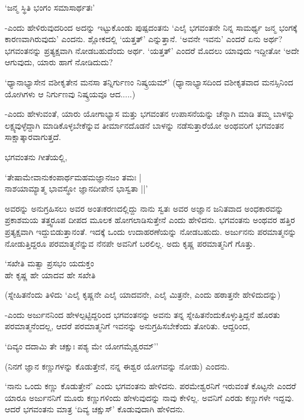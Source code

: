 \begin{shloka}
`ಜನ್ಮ ಸ್ಥಿತಿ ಭಂಗಂ ಸಮಾಸಾರ್ಥತಃ'
\end{shloka}

-ಎಂದು ಹೇಳಿರುವುದರಿಂದ ಅದನ್ನು ಇಟ್ಟುಕೊಂಡು ಪುಷ್ಪದಂತನು `ಎಲೈ ಭಗವಂತನೇ ನಿನ್ನ ಸಾಮರ್ಥ್ಯ ಜನ್ಮ ಭಂಗಕ್ಕೆ ಕಾರಣವಾಗಿರುವುದು' ಎಂದನು. ಶ್ಲೋಕದಲ್ಲಿ `ಯತ್ತತ್' ಎನ್ನುತ್ತಾನೆ. `ಅವನೇ ಇವನು' ಎಂದರೆ ಏನು ಅರ್ಥ? ಭಗವಂತನನ್ನು ಪ್ರತ್ಯಕ್ಷವಾಗಿ ನೋಡಬಹುದೆಂದು ಅರ್ಥ. `ಯತ್ತತ್' ಎಂದರೆ ಮೊದಲು ಯಾವುದು ಇದ್ದೀತೋ `ಅದೇ ಆಗುವುದು, ಯಾರು ಹಾಗೆ ನೋಡಿದುದು?

`ಧ್ಯಾನಾಭ್ಯಾಸೇನ ವಶೀಕೃತೇನ ಮನಸಾ ತನ್ನಿರ್ಗುಣಂ ನಿಷ್ಕ್ರಯಮ್' (ಧ್ಯಾನಾಭ್ಯಾಸದಿಂದ ವಶೀಕೃತವಾದ ಮನಸ್ಸಿನಿಂದ ಯೋಗಿಗಳು ಆ ನಿರ್ಗುಣವು ನಿಷ್ಕ್ರಯವೂ ಆದ.....)

-ಎಂದು ಹೇಳುವಂತೆ, ಯಾರು ಯೋಗಾಭ್ಯಾಸ ಮತ್ತು ಭಗವಂತನ ಉಪಾಸನೆಯನ್ನು ಚೆನ್ನಾಗಿ ಮಾಡಿ ತಮ್ಮ ಬಾಳನ್ನು ಲಕ್ಷ್ಯವುಳ್ಳೆದ್ದಾಗಿ ಮಾಡಿಕೊಳ್ಳಬೇಕೆನ್ನುವ ತೀರ್ಮಾನದೊಡನೆ ಬಾಳನ್ನು ನಡೆಸುತ್ತಾರೆಯೋ ಅಂಥವರಿಗೆ ಭಗವಂತನ ಸಾಕ್ಷಾತ್ಕಾರವಾಗುತ್ತದೆ.

ಭಗವಂತನು ಗೀತೆಯಲ್ಲಿ,

\begin{shloka}
`ತೇಷಾಮೇವಾನುಕಂಪಾರ್ಥಮಹಮಜ್ಞಾನಜಂ ತಮಃ |\\
ನಾಶಯಾಮ್ಯಾತ್ಮ ಭಾವಸ್ಥೋ ಜ್ಞಾನದೀಪೇನ ಭಾಸ್ವತಾ ||'
\end{shloka}

ಅವರನ್ನು ಅನುಗ್ರಹಿಸಲು ಅವರ ಅಂತಃಕರಣದಲ್ಲಿದ್ದು ನಾನು ಸ್ವತಃ ಅವರ ಅಜ್ಞಾನ ಜನಿತವಾದ ಅಂಧಕಾರವನ್ನು ಪ್ರಕಾಶಮಯ ತತ್ತ್ವರೂಪ ದೀಪದ ಮೂಲಕ ಹೋಗಲಾಡಿಸುತ್ತೇನೆ ಎಂದು ಹೇಳಿದನು. ಭಗವಂತನು ಅಂಥವರ ಹತ್ತಿರ ಪ್ರತ್ಯಕ್ಷವಾಗಿ ಇದ್ದುಬಿಡುತ್ತಾನಂತೆ. ಇದಕ್ಕೆ ಒಂದು ಉದಾಹರಣೆಯನ್ನು ನೋಡಬಹುದು. ಅರ್ಜುನನು ಪರಮಾತ್ಮನನ್ನು ನೋಡುತ್ತಿದ್ದರೂ ಪರಮಾತ್ಮನೆನ್ನುವ ನೆನಪೇ ಅವನಿಗೆ ಬರಲಿಲ್ಲ. ಅದು ಕೃಷ್ಣ ಪರಮಾತ್ಮನಿಗೆ ಗೊತ್ತು.

\begin{shloka}
`ಸಖೇತಿ ಮತ್ವಾ ಪ್ರಸಭಂ ಯದುಕ್ತಂ\\
ಹೇ ಕೃಷ್ಣ ಹೇ ಯಾದವ ಹೇ ಸಖೇತಿ
\end{shloka}

(ಸ್ನೇಹಿತನೆಂದು ತಿಳಿದು `ಎಲೈ ಕೃಷ್ಣನೇ ಎಲೈ ಯಾದವನೇ, ಎಲೈ ಮಿತ್ರನೇ, ಎಂದು ಹಠಾತ್ತನೇ ಹೇಳಿದುದನ್ನು)

-ಎಂದು ಅರ್ಜುನನಿಂದ ಹೇಳಲ್ಪಟ್ಟಿದ್ದರಿಂದ ಭಗವಂತನನ್ನು ಅವನು ತನ್ನ ಸ್ನೇಹಿತನೆಂದುಕೊಳ್ಳುತ್ತಿದ್ದನೆ ಹೊರತು ಪರಮಾತ್ಮನೆಂದಲ್ಲ, ಆದರೆ ಪರಮಾತ್ಮನಿಗೆ ಇವನನ್ನು ಅನುಗ್ರಹಿಸಬೇಕೆಂದು ತೋರಿತು. ಆದ್ದರಿಂದ,

\begin{shloka}
`ದಿವ್ಯಂ ದದಾಮಿ ತೇ ಚಕ್ಷುಃ ಪಶ್ಯ ಮೇ ಯೋಗಮೈಶ್ವರಮ್''
\end{shloka}

(ನಿನಗೆ ಜ್ಞಾನ ಕಣ್ಣುಗಳನ್ನು ಕೊಡುತ್ತೇನೆ, ನನ್ನ ಈಶ್ವರ ಯೋಗವನ್ನು ನೋಡು) ಎಂದನು.

`ನಾನು ಒಂದು ಕಣ್ಣು ಕೊಡುತ್ತೇನೆ' ಎಂದು ಭಗವಂತನು ಹೇಳಿದನು. ಪರಮೇಶ್ವರನಿಗೆ ಇರುವಂತೆ ಕೊಟ್ಟನೇ ಎಂದರೆ ಯಾರೂ ಅರ್ಜುನನಿಗೆ ಮೂರು ಕಣ್ಣುಗಳಿಂದು ಹೇಳುವುದನ್ನು ನಾವು ಕೇಳಿಲ್ಲ. ಅವನಿಗೆ ಎರಡು ಕಣ್ಣುಗಳೇ ಇದ್ದವು. ಆದರೆ ಭಗವಂತನು ಮಾತ್ರ `ದಿವ್ಯ ಚಕ್ಷುಸ್' ಕೊಡುವುದಾಗಿ ಹೇಳಿದನು.

